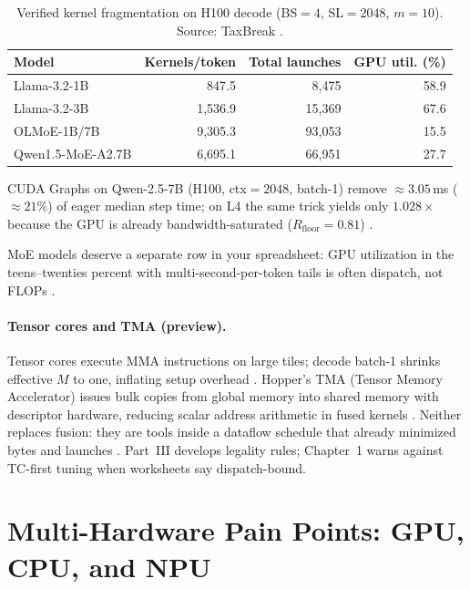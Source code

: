 \begin{table}[t]
\centering
\caption{Verified kernel fragmentation on H100 decode (BS${=}4$, SL${=}2048$, $m{=}10$). Source: TaxBreak \citep{taxbreak2026}.}
\label{tab:taxbreak_kernels}
\begin{tabular}{lrrr}
\toprule
\textbf{Model} & \textbf{Kernels/token} & \textbf{Total launches} & \textbf{GPU util. (\%)} \\
\midrule
Llama-3.2-1B & 847.5 & 8,475 & 58.9 \\
Llama-3.2-3B & 1,536.9 & 15,369 & 67.6 \\
OLMoE-1B/7B & 9,305.3 & 93,053 & 15.5 \\
Qwen1.5-MoE-A2.7B & 6,695.1 & 66,951 & 27.7 \\
\bottomrule
\end{tabular}
\end{table}

CUDA Graphs on Qwen-2.5-7B (H100, ctx${=}2048$, batch-1) remove ${\approx}3.05$\,ms (${\approx}21\%$) of eager median step time; on L4 the same trick yields only $1.028\times$ because the GPU is already bandwidth-saturated ($R_{\mathrm{floor}}{=}0.81$) \citep{memoryfloor2026,nvidia2024cudagraphs}.

MoE models deserve a separate row in your spreadsheet: GPU utilization in the teens--twenties percent with multi-second-per-token tails is often dispatch, not FLOPs \citep{taxbreak2026,wang2025decoupledanalysiso}.


\paragraph{Tensor cores and TMA (preview).}
Tensor cores execute MMA instructions on large tiles; decode batch-1 shrinks effective $M$ to one, inflating setup overhead \citep{semianalysis2024tma}.
Hopper's TMA (Tensor Memory Accelerator) issues bulk copies from global memory into shared memory with descriptor hardware, reducing scalar address arithmetic in fused kernels \citep{semianalysis2024tma}.
Neither replaces fusion: they are tools inside a dataflow schedule that already minimized bytes and launches \citep{yirage2026}.
Part~III develops legality rules; Chapter~1 warns against TC-first tuning when worksheets say dispatch-bound.

\section{Multi-Hardware Pain Points: GPU, CPU, and NPU}
\label{sec:multi_hardware}

